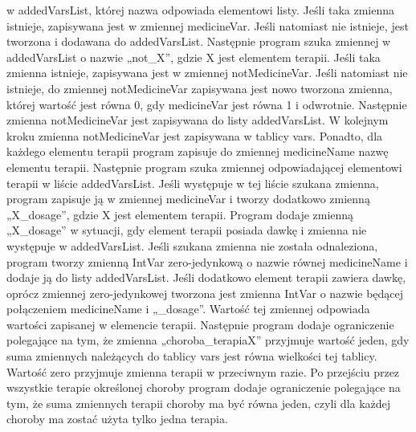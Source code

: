 w addedVarsList, której nazwa odpowiada elementowi listy. Jeśli taka zmienna istnieje, zapisywana jest w zmiennej medicineVar. Jeśli natomiast nie istnieje, jest tworzona i dodawana do addedVarsList. Następnie program szuka zmiennej w addedVarsList o nazwie „not\_X”, gdzie X jest elementem terapii. Jeśli taka zmienna istnieje, zapisywana jest w zmiennej notMedicineVar. Jeśli natomiast nie istnieje, do zmiennej notMedicineVar zapisywana jest nowo tworzona zmienna, której wartość jest równa 0, gdy medicineVar jest równa 1 i odwrotnie. Następnie zmienna notMedicineVar jest zapisywana do listy addedVarsList. W kolejnym kroku zmienna notMedicineVar jest zapisywana w tablicy vars. Ponadto, dla każdego elementu terapii program zapisuje do zmiennej medicineName nazwę elementu terapii. Następnie program szuka zmiennej odpowiadającej elementowi terapii w liście addedVarsList. Jeśli występuje w tej liście szukana zmienna, program zapisuje ją w zmiennej medicineVar i tworzy dodatkowo zmienną „X\_dosage”, gdzie X jest elementem terapii. Program dodaje zmienną „X\_dosage” w sytuacji, gdy element terapii posiada dawkę i zmienna nie występuje w addedVarsList. Jeśli szukana zmienna nie została odnaleziona, program tworzy zmienną IntVar zero-jedynkową o nazwie równej medicineName i dodaje ją do listy addedVarsList. Jeśli dodatkowo element terapii zawiera dawkę, oprócz zmiennej zero-jedynkowej tworzona jest zmienna IntVar o nazwie będącej połączeniem medicineName i „\_dosage”. Wartość tej zmiennej odpowiada wartości zapisanej w elemencie terapii. Następnie program dodaje ograniczenie polegające na tym, że zmienna „choroba\_terapiaX” przyjmuje wartość jeden, gdy suma zmiennych należących do tablicy vars jest równa wielkości tej tablicy. Wartość zero przyjmuje zmienna terapii w przeciwnym razie. Po przejściu przez wszystkie terapie określonej choroby program dodaje ograniczenie polegające na tym, że suma zmiennych terapii choroby ma być równa jeden, czyli dla każdej choroby ma zostać użyta tylko jedna terapia. 

